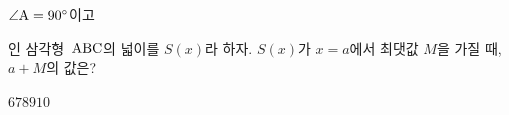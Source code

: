 $\angle\mathrm{A}=90^\circ$이고 \par\smallskip{}\par\smallskip\noindent 인 삼각형~$\mathrm{ABC}$의 넓이를 $S(x)$라 하자. $S(x)$가 $x=a$에서 \mbox{최댓값} $M$을 가질 때, $a+M$의 값은? 
\begin{choices32}{$6$}{$7$}{$8$}{$9$}{$10$}\end{choices32}
